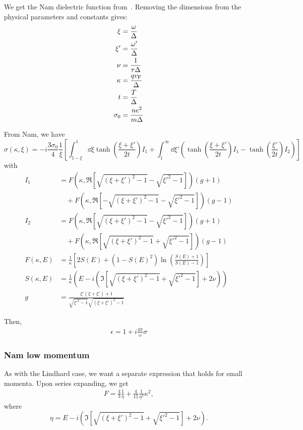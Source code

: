 \documentclass[../main.tex]{subfiles}
\begin{document}
	We get the Nam dielectric function from~\cite{Nam1967}.
	Removing the dimensions from the physical parameters and constants gives:
	\begin{align}
		\xi &= \frac{\omega}{\Delta} \\
		\xi' &= \frac{\omega'}{\Delta} \\
		\nu &= \frac{1}{\tau \Delta} \\
		\kappa &= \frac{q v_{\mathrm{F}}}{\Delta} \\
		t &= \frac{T}{\Delta} \\
		\sigma_0 &= \frac{n e^2}{m \Delta}
	\end{align}

	From Nam, we have
	\begin{equation}
		\sigma(\kappa, \xi) = -i \frac{3 \sigma_0}{4} \frac{1}{\xi}\left[\int_{1 - \xi}^{1}\dd{\xi} \tanh(\frac{\xi + \xi'}{2 t}) I_1 + \int_{1}^{\infty} \dd{\xi'} \left( \tanh(\frac{\xi + \xi'}{2t}) I_1  - \tanh(\frac{\xi'}{2t})I_2 \right) \right]
	\end{equation}
	with
	\begin{align}
		I_1 &= F(\kappa, \Re[\sqrt{(\xi + \xi')^2 - 1} - \sqrt{\xi'^2 - 1}]) (g + 1) \nonumber\\
		&\quad + F(\kappa, \Re[-\sqrt{(\xi + \xi')^2 - 1} - \sqrt{\xi'^2 - 1}]) (g - 1) \\
		I_2 &= F(\kappa, \Re[\sqrt{(\xi + \xi')^2 - 1} - \sqrt{\xi'^2 - 1}]) (g + 1) \nonumber\\
		&\quad + F(\kappa, \Re[\sqrt{(\xi + \xi')^2 - 1} + \sqrt{\xi'^2 - 1}]) (g - 1) \\
		F(\kappa, E) &= \frac{1}{\kappa} \left[2 S(E) + (1 - S(E)^2)\ln(\frac{S(E) + 1}{S(E) - 1})\right]  \\
		S(\kappa, E) &= \frac{1}{\kappa} \left(E - i \left(\Im[\sqrt{(\xi + \xi')^2 - 1} + \sqrt{\xi'^2 - 1}] + 2 \nu \right) \right) \\
		g  &= \frac{\xi' \left( \xi + \xi'\right) + 1}{\sqrt{\xi'^2 - 1}\sqrt{(\xi + \xi')^2 - 1}}
	\end{align}

	Then,
	\begin{gather}
		\epsilon = 1 + i \frac{4 \pi}{\omega} \sigma
	\end{gather}

	\subsubsection{Nam low momentum}
	As with the Lindhard case, we want a separate expression that holds for small momenta.
	Upon series expanding, we get
	\begin{align}
		F =\frac43 \frac{1}{\eta} + \frac{4}{15} \frac{1}{\eta^3} \kappa^2,
	\end{align}
	where
	\begin{equation}
		\eta = E - i \left(\Im[\sqrt{(\xi + \xi')^2 - 1} + \sqrt{\xi'^2 - 1}] + 2 \nu \right).
	\end{equation}
\end{document}
